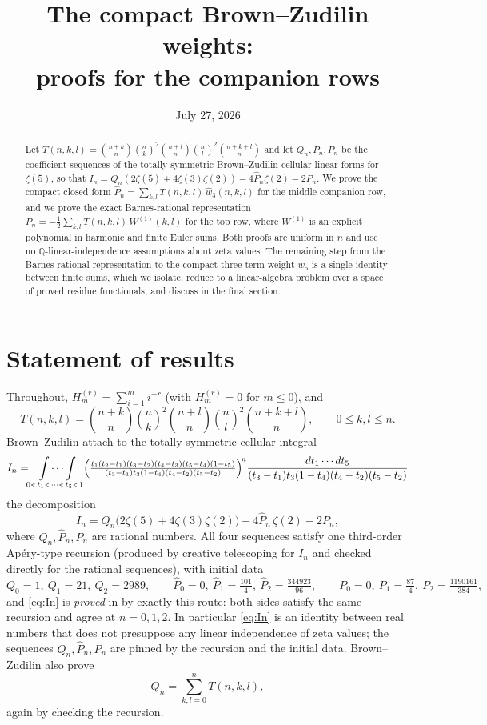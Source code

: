 \documentclass[11pt]{article}
\title{The compact Brown--Zudilin weights:\\ proofs for the companion rows}
\author{}
\date{July 27, 2026}
\theoremstyle{remark}
\newcommand{\Hh}[2]{H_{#1}^{(#2)}}
\newcommand{\QQ}{\mathbb Q}
\begin{document}
\maketitle

\begin{abstract}
Let $T(n,k,l)=\binom{n+k}{n}\binom nk^2\binom{n+l}{n}\binom nl^2\binom{n+k+l}{n}$
and let $Q_n,\hat P_n,P_n$ be the coefficient sequences of the totally symmetric
Brown--Zudilin cellular linear forms for $\zeta(5)$, so that
$I_n=Q_n(2\zeta(5)+4\zeta(3)\zeta(2))-4\hat P_n\zeta(2)-2P_n$.
We prove the compact closed form
$\hat P_n=\sum_{k,l}T(n,k,l)\,\hat w_3(n,k,l)$ for the middle companion row,
and we prove the exact Barnes-rational representation
$P_n=-\tfrac12\sum_{k,l}T(n,k,l)\,W^{(1)}(k,l)$
for the top row, where $W^{(1)}$ is an explicit polynomial in harmonic and
finite Euler sums.  Both proofs are uniform in $n$ and use no
$\QQ$-linear-independence assumptions about zeta values.  The remaining step
from the Barnes-rational representation to the compact three-term weight
$w_5$ is a single identity between finite sums, which we isolate, reduce to a
linear-algebra problem over a space of proved residue functionals, and
discuss in the final section.
\end{abstract}

\section{Statement of results}\label{sec:results}

Throughout, $\Hh mr=\sum_{i=1}^m i^{-r}$ (with $\Hh mr=0$ for $m\le 0$), and
\[
 T(n,k,l)
 =\binom{n+k}{n}\binom nk^2\binom{n+l}{n}\binom nl^2\binom{n+k+l}{n},
 \qquad 0\le k,l\le n .
\]
Brown--Zudilin \cite[Sec.~2]{BZ} attach to the totally symmetric cellular
integral
\[
 I_n=\idotsint\limits_{0<t_1<\dots<t_5<1}
 \Bigl(\tfrac{t_1(t_2-t_1)(t_3-t_2)(t_4-t_3)(t_5-t_4)(1-t_5)}
 {(t_3-t_1)t_3(1-t_4)(t_4-t_2)(t_5-t_2)}\Bigr)^{\!n}
 \frac{dt_1\cdots dt_5}{(t_3-t_1)t_3(1-t_4)(t_4-t_2)(t_5-t_2)}
\]
the decomposition
\begin{equation}\label{eq:In}
 I_n=Q_n\bigl(2\zeta(5)+4\zeta(3)\zeta(2)\bigr)-4\hat P_n\,\zeta(2)-2P_n,
\end{equation}
where $Q_n,\hat P_n,P_n$ are rational numbers.  All four sequences satisfy
one third-order Ap\'ery-type recursion (produced by creative telescoping for
$I_n$ and checked directly for the rational sequences), with initial data
\[
 Q_0=1,\ Q_1=21,\ Q_2=2989,\qquad
 \hat P_0=0,\ \hat P_1=\tfrac{101}4,\ \hat P_2=\tfrac{344923}{96},\qquad
 P_0=0,\ P_1=\tfrac{87}4,\ P_2=\tfrac{1190161}{384},
\]
and \eqref{eq:In} is \emph{proved} in \cite{BZ} by exactly this route:
both sides satisfy the same recursion and agree at $n=0,1,2$.  In
particular \eqref{eq:In} is an identity between real numbers that does not
presuppose any linear independence of zeta values; the sequences
$Q_n,\hat P_n,P_n$ are pinned by the recursion and the initial data.
Brown--Zudilin also prove
\begin{equation}\label{eq:Qn}
 Q_n=\sum_{k,l=0}^{n}T(n,k,l),
\end{equation}
again by checking the recursion.
\end{document}
